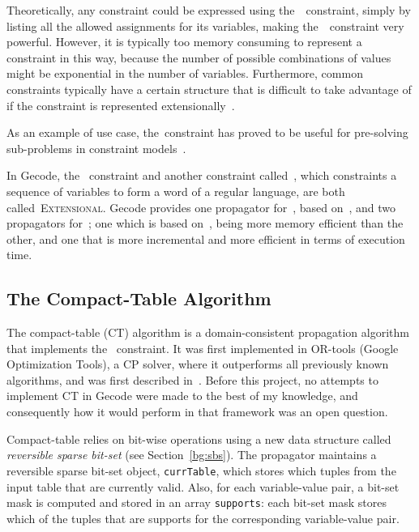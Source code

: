 \documentclass[a4paper,11pt]{article}
\newcommand{\Secref}[1]{Section~\ref{#1}}
\newcommand{\Table}{\Constraint{Table}}
\newcommand{\Regular}{\Constraint{Regular}}
\newcommand{\Extensional}{\Constraint{Extensional}~}
\def\Extensional{\textsc{Extensional}}
\newcommand{\CTpaper}[0]{DBLP:conf/cp/DemeulenaereHLP16}
\numberwithin{equation}{section}
\begin{document}
Theoretically, any constraint could be expressed using the~\Table~constraint,
simply by listing all the allowed assignments for its variables, 
making the~\Table~constraint very powerful. However,
it is typically too memory consuming to represent a constraint in this way,
because the number of possible combinations of values might be exponential in the
number of variables.
Furthermore, common constraints
typically have a certain structure
that is difficult to take advantage of if the constraint is represented
extensionally~\cite{SchulteCarlsson:FDsys}.

As an example of use case, the~\Table constraint has proved to be useful for
pre-solving sub-problems in constraint models~\cite{Dekker:MSc}.

In Gecode, the \Table~constraint and another constraint 
called~, which constraints a sequence of variables
to form a word of a regular language, are both called~\Extensional.
Gecode provides one propagator for~\Regular, based on~\cite{Pesant:seqs},
and two propagators for~\Table; one which is based
on~\cite{DBLP:journals/ai/BessiereRYZ05}, being more memory efficient
than the other,
and one that is more incremental and more efficient in terms of execution time.

\subsection{The Compact-Table Algorithm}
\label{bg:ct}
The compact-table (CT) algorithm is a domain-consistent propagation algorithm
that implements the \Table~constraint. It was first implemented in
OR-tools (Google Optimization Tools), a CP solver, 
where it outperforms all previously
known algorithms, and was first described in~\cite{\CTpaper}.
Before this project, no attempts to implement CT in Gecode were made
to the best of my knowledge,
and consequently how it would perform in that framework
was an open question.

Compact-table relies on bit-wise operations using a new 
data structure
called \emph{reversible sparse bit-set} (see \Secref{bg:sbs}).
The propagator maintains a reversible sparse bit-set object, \texttt{currTable},
which stores which tuples from the input table that are currently valid.
Also, for each variable-value pair, a bit-set mask is computed and stored in an 
array \texttt{supports}:
each bit-set mask stores which of the tuples that are supports for the
corresponding variable-value pair.
\end{document}

